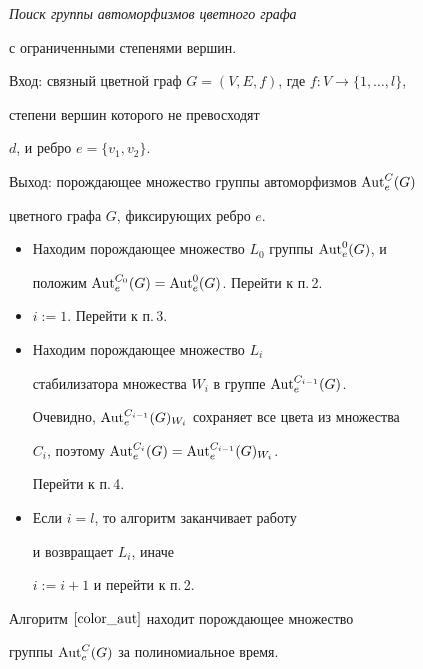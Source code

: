 \begin{algs}


{\it Поиск группы автоморфизмов цветного графа


с ограниченными степенями вершин.}\label{color_aut}





Вход: связный цветной граф $G=(V, E, f)$, где $f:V\to \{1, \dotsc, l\}$, 


степени вершин которого не превосходят


$d$, и ребро $e=\{v_1, v_2\}$.





Выход: порождающее множество группы автоморфизмов $\operatorname{Aut}^C_e(G)$


цветного графа $G$, фиксирующих ребро $e$.


\begin{itemize}


\item[1.] Находим порождающее множество $L_0$ группы $\operatorname{Aut}_e^0 (G)$, и


положим $\operatorname{Aut}_e^{C_0} (G)=\operatorname{Aut}_e^0 (G)$. Перейти к п.\,2.


\item[2.] $i:=1$. Перейти к п.\,3.


\item[3.] Находим порождающее множество $L_i$


стабилизатора множества $W_i$ в группе $\operatorname{Aut}^{C_{i-1}}_e(G)$.


Очевидно, $\operatorname{Aut}^{C_{i-1}}_e(G)_{W_i}$ сохраняет все цвета из множества


$C_i$, поэтому $\operatorname{Aut}^{C_i}_e(G)=\operatorname{Aut}^{C_{i-1}}_e(G)_{W_i}$.


Перейти к п.\,4.


\item[4.] Если $i=l$, то алгоритм заканчивает работу


и возвращает $L_i$, иначе


$i:=i+1$ и перейти к п.\,2.


\end{itemize}


\end{algs}





\begin{thms}


Алгоритм $\ref{color_aut}$ находит порождающее множество


группы $\operatorname{Aut}^C_e(G)$ за полиномиальное время.


\end{thms}





